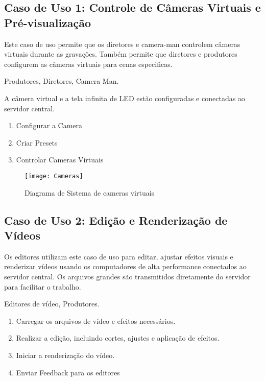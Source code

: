 \subsection{Caso de Uso 1: Controle de Câmeras Virtuais e Pré-visualização}
\begin{description}[style=nextline]
    \item[Descrição:] Este caso de uso permite que os diretores e camera-man controlem câmeras virtuais durante as gravações. Também permite que diretores e produtores configurem as câmeras virtuais para cenas especificas.
    
    \item[Atores:] Produtores, Diretores, Camera Man.
    
    \item[Pré-condição:] A câmera virtual e a tela infinita de LED estão configuradas e conectadas ao servidor central.
    
    \item[Ações:]
    \begin{enumerate}
        \item Configurar a Camera
        \item Criar Presets
        \item Controlar Cameras Virtuais
    \end{enumerate}
    
\end{description}

\begin{figure}[ht]
    \centering
    \texttt{[image: Cameras]}
    \caption{Diagrama de Sistema de cameras virtuais}
    \label{fig:diagram1}
\end{figure}

\subsection{Caso de Uso 2: Edição e Renderização de Vídeos}
\begin{description}[style=nextline]
    \item[Descrição:] Os editores utilizam este caso de uso para editar, ajustar efeitos visuais e renderizar vídeos usando os computadores de alta performance conectados ao servidor central. Os arquivos grandes são transmitidos diretamente do servidor para facilitar o trabalho.
    
    \item[Atores:] Editores de vídeo, Produtores.
    
    \item[Ações:]
    \begin{enumerate}
        \item Carregar os arquivos de vídeo e efeitos necessários.
        \item Realizar a edição, incluindo cortes, ajustes e aplicação de efeitos.
        \item Iniciar a renderização do vídeo.
        \item Enviar Feedback para os editores
    \end{enumerate}
\end{description}

